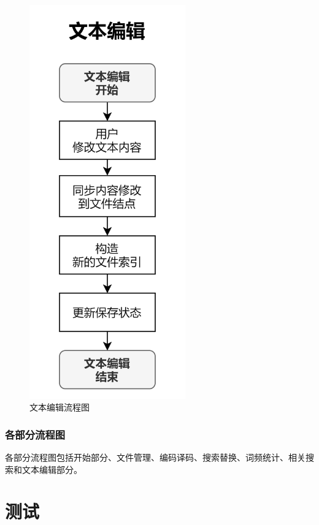 \documentclass[scheme = chinese]{ctexart}
\begin{document}
\begin{figure}[h]
\begin{minipage}[t]{0.48\textwidth}
        \includegraphics[width=0.6\textwidth]{images/dsacd-流程图-文本编辑.drawio.png}
        \caption{文本编辑流程图}
    \end{minipage}
\end{figure}

\subsubsection{各部分流程图}
各部分流程图包括开始部分、文件管理、编码译码、搜索替换、词频统计、相关搜索和文本编辑部分。

\clearpage

\section{测试}
\end{document}
